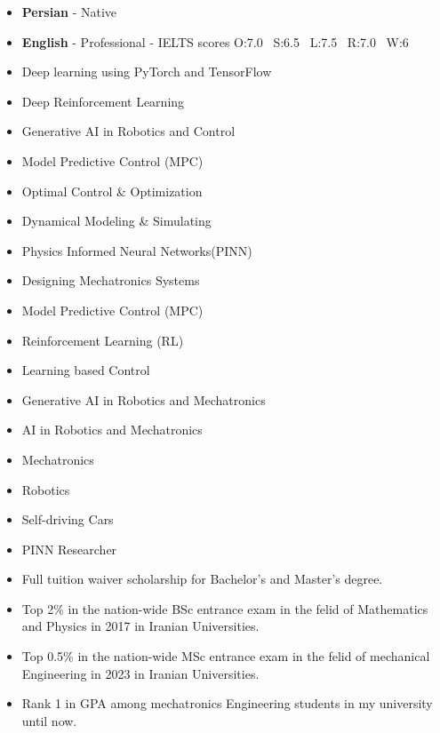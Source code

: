 \begin{itemize}
    \item \textbf{Persian} - Native
    \item \textbf{English} - Professional - IELTS scores \linebreak O:7.0 \ S:6.5 \ L:7.5 \ R:7.0 \ W:6
\end{itemize}


\begin{itemize}
    \item Deep learning using PyTorch and TensorFlow
    \item Deep Reinforcement Learning
    \item Generative AI in Robotics and Control
    \item Model Predictive Control (MPC)
    \item Optimal Control \& Optimization
    \item Dynamical Modeling \& Simulating
    \item Physics Informed Neural Networks(PINN)
    \item Designing Mechatronics Systems
\end{itemize}

\begin{itemize}
    \item Model Predictive Control (MPC)
    \item Reinforcement Learning (RL)
    \item Learning based Control
    \item Generative AI in Robotics and Mechatronics
    \item AI in Robotics and Mechatronics
    \item Mechatronics
    \item Robotics
    \item Self-driving Cars
    \item PINN Researcher
\end{itemize}


\begin{itemize}
    \item Full tuition waiver scholarship for Bachelor's and Master's degree.
    \item Top 2\% in the nation-wide BSc entrance exam in the felid of Mathematics and Physics in 2017 in Iranian Universities.
    \item Top 0.5\% in the nation-wide MSc entrance exam in the felid of mechanical Engineering in 2023 in Iranian Universities.
    \item Rank 1 in GPA among mechatronics Engineering students in my university until now.
\end{itemize}

